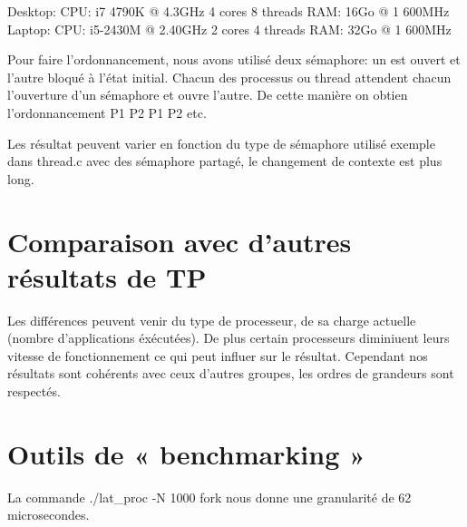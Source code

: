 \documentclass[12pt]{article}
\begin{document}
Desktop: CPU: i7 4790K @ 4.3GHz 4 cores 8 threads RAM: 16Go @ 1 600MHz
Laptop: CPU: i5-2430M @ 2.40GHz 2 cores 4 threads RAM: 32Go @ 1 600MHz

Pour faire l'ordonnancement, nous avons utilisé deux sémaphore: un est ouvert
et l'autre bloqué à l'état initial. Chacun des processus ou thread attendent
chacun l'ouverture d'un sémaphore et ouvre l'autre. De cette manière on obtien
l'ordonnancement P1 P2 P1 P2 etc.

Les résultat peuvent varier en fonction du type de sémaphore utilisé exemple
dans thread.c avec des sémaphore partagé, le changement de contexte est plus
long.

\section{Comparaison avec d'autres résultats de TP}

Les différences peuvent venir du type de processeur, de sa charge actuelle (nombre d'applications éxécutées).
De plus certain processeurs diminiuent leurs vitesse de fonctionnement ce qui peut influer sur le résultat.
Cependant nos résultats sont cohérents avec ceux d'autres groupes, les ordres de grandeurs sont respectés.

\section{Outils de « benchmarking »}
La commande ./lat_proc -N 1000 fork nous donne une granularité de 62 microsecondes. \newline
\end{document}
